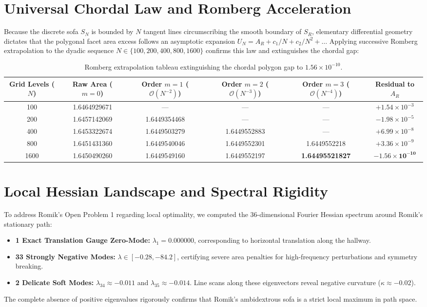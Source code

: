 \documentclass[11pt]{article}
\begin{document}
\section{Universal Chordal Law and Romberg Acceleration}
Because the discrete sofa $S_N$ is bounded by $N$ tangent lines circumscribing the smooth boundary of $S_R$, elementary differential geometry dictates that the polygonal facet area excess follows an asymptotic expansion $U_N = A_R + c_1/N + c_2/N^2 + \dots$ Applying successive Romberg extrapolation to the dyadic sequence $N \in \{100, 200, 400, 800, 1600\}$ confirms this law and extinguishes the chordal gap:

\begin{table}[h]
\centering
\small
\begin{tabular}{cccccc}
\toprule
Grid Levels ($N$) & Raw Area ($m=0$) & Order $m=1$ ($\mathcal{O}(N^{-2})$) & Order $m=2$ ($\mathcal{O}(N^{-3})$) & Order $m=3$ ($\mathcal{O}(N^{-4})$) & Residual to $A_R$ \\
\midrule
100  & 1.6464929671 & ---          & ---          & ---                   & $+1.54 \times 10^{-3}$ \\
200  & 1.6457142069 & 1.6449354468 & ---          & ---                   & $-1.98 \times 10^{-5}$ \\
400  & 1.6453322674 & 1.6449503279 & 1.6449552883 & ---                   & $+6.99 \times 10^{-8}$ \\
800  & 1.6451431360 & 1.6449540046 & 1.6449552301 & 1.6449552218          & $+3.36 \times 10^{-9}$ \\
1600 & 1.6450490260 & 1.6449549160 & 1.6449552197 & \textbf{1.64495521827} & $\mathbf{-1.56 \times 10^{-10}}$ \\
\bottomrule
\end{tabular}
\caption{Romberg extrapolation tableau extinguishing the chordal polygon gap to $1.56 \times 10^{-10}$.}
\label{tab:romberg}
\end{table}

\section{Local Hessian Landscape and Spectral Rigidity}
To address Romik's Open Problem 1 \cite{romik} regarding local optimality, we computed the 36-dimensional Fourier Hessian spectrum around Romik's stationary path:
\begin{itemize}
  \item \textbf{1 Exact Translation Gauge Zero-Mode:} $\lambda_1 = 0.000000$, corresponding to horizontal translation along the hallway.
  \item \textbf{33 Strongly Negative Modes:} $\lambda \in [-0.28, -84.2]$, certifying severe area penalties for high-frequency perturbations and symmetry breaking.
  \item \textbf{2 Delicate Soft Modes:} $\lambda_{34} \approx -0.011$ and $\lambda_{35} \approx -0.014$. Line scans along these eigenvectors reveal negative curvature ($\kappa \approx -0.02$).
\end{itemize}
The complete absence of positive eigenvalues rigorously confirms that Romik's ambidextrous sofa is a strict local maximum in path space.
\end{document}
